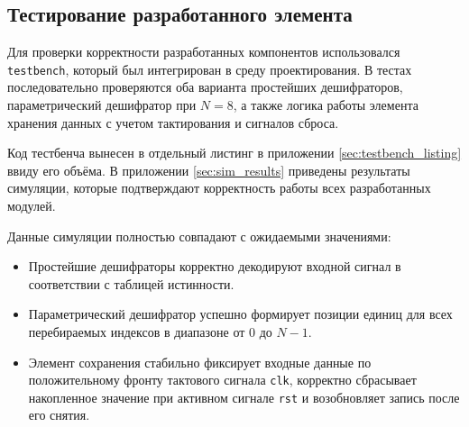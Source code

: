 \subsection{Тестирование разработанного элемента}

Для проверки корректности разработанных компонентов использовался \texttt{testbench}, который был интегрирован в среду проектирования. В тестах последовательно проверяются оба варианта простейших дешифраторов, параметрический дешифратор при $N=8$, а также логика работы элемента хранения данных с учетом тактирования и сигналов сброса. 

Код тестбенча вынесен в отдельный листинг в приложении \ref{sec:testbench_listing} ввиду его объёма. В приложении \ref{sec:sim_results} приведены результаты симуляции, которые подтверждают корректность работы всех разработанных модулей.

Данные симуляции полностью совпадают с ожидаемыми значениями:
\begin{itemize}
    \item Простейшие дешифраторы корректно декодируют входной сигнал в соответствии с таблицей истинности.
    \item Параметрический дешифратор успешно формирует позиции единиц для всех перебираемых индексов в диапазоне от $0$ до $N-1$.
    \item Элемент сохранения стабильно фиксирует входные данные по положительному фронту тактового сигнала \texttt{clk}, корректно сбрасывает накопленное значение при активном сигнале \texttt{rst} и возобновляет запись после его снятия.
\end{itemize}